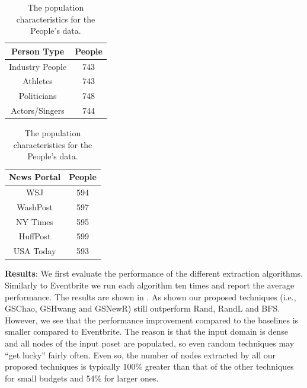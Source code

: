 \begin{table}
\scriptsize\center
\caption{The population characteristics for the People's data.}
\label{tab:ptypedata}
\begin{tabular}{|c|c|}
\hline
\textbf{Person Type} & \textbf{People} \\ \hline
Industry People & 743 \\
Athletes & 743 \\
Politicians & 748 \\
Actors/Singers & 744 \\ \hline
\end{tabular}
\quad
\begin{tabular}{|c|c|}
\hline
\textbf{News Portal} & \textbf{People} \\ \hline
WSJ & 594 \\
WashPost & 597 \\
NY Times & 595 \\
HuffPost & 599 \\
USA Today & 593 \\ \hline
\end{tabular}
\vspace{-10pt}
\end{table}


\vspace{5pt}\noindent\textbf{Results}: We first evaluate the performance of the different extraction algorithms. Similarly to Eventbrite we run each algorithm ten times and report the average performance. The results are shown in . As shown our proposed techniques (i.e., GSChao, GSHwang and GSNewR) still outperform Rand, RandL and BFS. However, we see that the performance improvement compared to the baselines is smaller compared to Eventbrite. The reason is that the input domain is dense and all nodes of the input poset are populated, so even random techniques may ``get lucky'' fairly often. Even so, the number of nodes extracted by all our proposed techniques is typically 100\% greater than that of the other techniques for small budgets and 54\% for larger ones.

